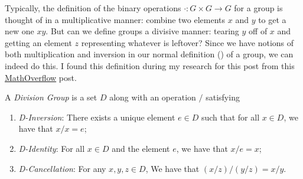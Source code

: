 \documentclass{article}
\begin{document}
Typically, the definition of the binary operations $\cdot\colon G \times G \to G$ for a group is thought of in a multiplicative manner: combine two elements $x$ and $y$ to get a new one $xy$.
But can we define groups a divisive manner: tearing $y$ off of $x$ and getting an element $z$ representing whatever is leftover?
Since we have notions of both multiplication and inversion in our normal definition () of a group, we can indeed do this.
I found this definition during my research for this post from this \href{https://mathoverflow.net/questions/277938/wieners-axiomatization-of-the-group-law-based-on-division}{MathOverflow} post.

\begin{defn}\label{defn:div-grp}
  A \emph{Division Group} is a set $D$ along with an operation $/$ satisfying
  \begin{enumerate}
  \item \emph{D-Inversion}: There exists a unique element $e \in D$ such that for all $x \in D$, we have that $x / x = e$;
  \item \emph{D-Identity}: For all $x \in D$ and the element $e$, we have that $x / e = x$;
  \item \emph{D-Cancellation}: For any $x, y, z \in D$, We have that $(x / z) / (y / z) = x / y$.
  \end{enumerate}
\end{defn}
\end{document}
